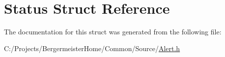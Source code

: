 \hypertarget{struct_status}{}\section{Status Struct Reference}
\label{struct_status}


The documentation for this struct was generated from the following file\+:\begin{DoxyCompactItemize}
\item 
C\+:/\+Projects/\+Bergermeister\+Home/\+Common/\+Source/\mbox{\hyperlink{_alert_8h}{Alert.\+h}}\end{DoxyCompactItemize}
